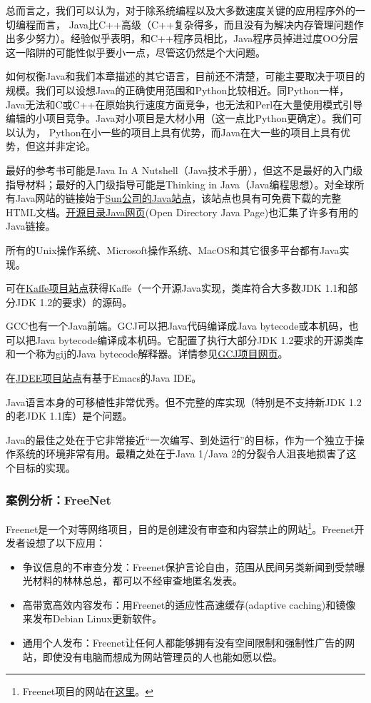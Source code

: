 \documentclass[12pt,oneside]{book}
\begin{document}
\begin{common-format}
总而言之，我们可以认为，对于除系统编程以及大多数速度关键的应用程序外的一切编程而言， Java比C++高级（C++复杂得多，而且没有为解决内存管理问题作出多少努力）。经验似乎表明，和C++程序员相比，Java程序员掉进过度OO分层这一陷阱的可能性似乎要小一点，尽管这仍然是个大问题。

如何权衡Java和我们本章描述的其它语言，目前还不清楚，可能主要取决于项目的规模。我们可以设想Java的正确使用范围和Python比较相近。同Python一样，Java无法和C或C++在原始执行速度方面竞争，也无法和Perl在大量使用模式引导编辑的小项目竞争。Java对小项目是大材小用（这一点比Python更确定）。我们可以认为，
Python在小一些的项目上具有优势，而Java在大一些的项目上具有优势，但这并非定论。

最好的参考书可能是Java In A Nutshell（Java技术手册）\cite{FlanaganJava}，但这不是最好的入门级指导材料；最好的入门级指导可能是Thinking in Java（Java编程思想）\cite{Eckel}。对全球所有Java网站的链接始于\href{http://java.sun.com/}{Sun公司的Java站点}，该站点也具有可免费下载的完整HTML文档。\href{http://dmoz.org/Computers/Programming/Languages/Java/}{开源目录Java网页}(Open Directory Java Page)也汇集了许多有用的Java链接。

所有的Unix操作系统、Microsoft操作系统、MacOS和其它很多平台都有Java实现。

可在\href{http://www.kaffe.org/}{Kaffe项目站点}获得Kaffe（一个开源Java实现，类库符合大多数JDK 1.1和部分JDK 1.2的要求）的源码。

GCC也有一个Java前端。GCJ可以把Java代码编译成Java bytecode或本机码，也可以把Java bytecode编译成本机码。它配置了执行大部分JDK 1.2要求的开源类库和一个称为gij的Java bytecode解释器。详情参见\href{http://gcc.gnu.org/java/}{GCJ项目网页}。

在\href{http://jdee.sunsite.dk/}{JDEE项目站点}有基于Emacs的Java IDE。

Java语言本身的可移植性非常优秀。但不完整的库实现（特别是不支持新JDK 1.2的老JDK 1.1库）是个问题。

Java的最佳之处在于它非常接近“一次编写、到处运行”的目标，作为一个独立于操作系统的环境非常有用。最糟之处在于Java 1/Java 2的分裂令人沮丧地损害了这个目标的实现。


\subsubsection{案例分析：FreeNet}
Freenet是一个对等网络项目，目的是创建没有审查和内容禁止的网站\footnote{Freenet项目的网站在\href{http://freenetproject.org/}{这里}。}。Freenet开发者设想了以下应用：

\begin{itemize}
\item 争议信息的不审查分发：Freenet保护言论自由，范围从民间另类新闻到受禁曝光材料的林林总总，都可以不经审查地匿名发表。
\item  高带宽高效内容发布：用Freenet的适应性高速缓存(adaptive caching)和镜像来发布Debian Linux更新软件。
\item 通用个人发布：Freenet让任何人都能够拥有没有空间限制和强制性广告的网站，即使没有电脑而想成为网站管理员的人也能如愿以偿。
\end{itemize}


\end{common-format}
\end{document}
